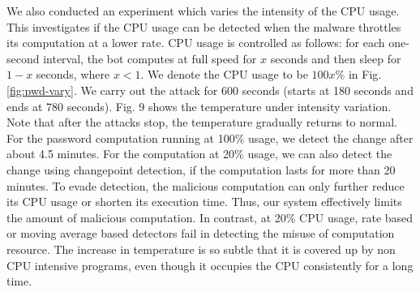 %

We also conducted an experiment which varies the intensity of the
CPU usage. This investigates if the CPU usage can be detected when
the malware throttles its computation at a lower rate. CPU usage is
controlled as follows: for each one-second interval, the bot
computes at full speed for $x$ seconds and then sleep for $1-x$
seconds, where $x<1$. We denote the CPU usage to be $100x$\% in Fig.
\ref{fig:pwd-vary}. We carry out the attack for 600 seconds (starts
at 180 seconds and ends at 780 seconds). Fig. 9 shows the
temperature under intensity variation. Note that after the attacks
stop, the temperature gradually returns to normal.  For the password
computation running at 100\% usage, we detect the change after about
4.5 minutes.  For the computation at 20\% usage, we can also detect
the change using changepoint detection, if the computation lasts for more than 20 minutes. To
evade detection, the malicious computation can only further reduce
its CPU usage or shorten its execution time.
Thus, our system effectively limits the amount of malicious computation. In contrast, at 20\% CPU usage, 
rate based or moving average based detectors fail in detecting the misuse of computation resource. 
The increase in temperature is so subtle that it is covered up by non CPU intensive programs, even though it occupies the CPU consistently for a long time.
